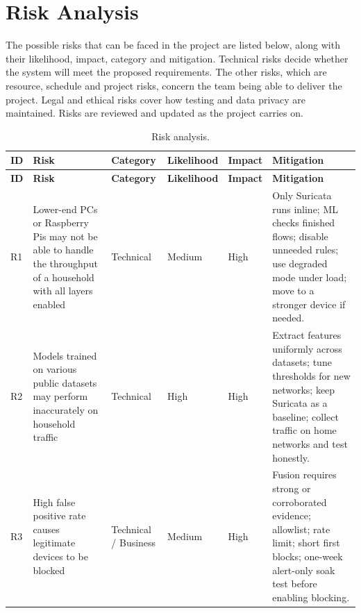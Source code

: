 \section{Risk Analysis}\label{sec:4.10}

\noindent The possible risks that can be faced in the project are listed below, along with their likelihood, impact, category and mitigation. Technical risks decide whether the system will meet the proposed requirements. The other risks, which are resource, schedule and project risks, concern the team being able to deliver the project. Legal and ethical risks cover how testing and data privacy are maintained. Risks are reviewed and updated as the project carries on.

{\footnotesize\setlength{\tabcolsep}{3.5pt}
\begin{longtable}{|>{\raggedright\arraybackslash}p{}|>{\raggedright\arraybackslash}p{}|>{\raggedright\arraybackslash}p{}|>{\raggedright\arraybackslash}p{}|>{\raggedright\arraybackslash}p{}|>{\raggedright\arraybackslash}p{}|}
\caption{Risk analysis.}\label{tab:4.29}\\
\hline
\textbf{ID} & \textbf{Risk} & \textbf{Category} & \textbf{Likelihood} & \textbf{Impact} & \textbf{Mitigation} \\ \hline
\endfirsthead
\hline
\textbf{ID} & \textbf{Risk} & \textbf{Category} & \textbf{Likelihood} & \textbf{Impact} & \textbf{Mitigation} \\ \hline
\endhead
R1 & Lower-end PCs or Raspberry Pis may not be able to handle the throughput of a household with all layers enabled & Technical & Medium & High & Only Suricata runs inline; ML checks finished flows; disable unneeded rules; use degraded mode under load; move to a stronger device if needed. \\ \hline
R2 & Models trained on various public datasets may perform inaccurately on household traffic & Technical & High & High & Extract features uniformly across datasets; tune thresholds for new networks; keep Suricata as a baseline; collect traffic on home networks and test honestly. \\ \hline
R3 & High false positive rate causes legitimate devices to be blocked & Technical / Business & Medium & High & Fusion requires strong or corroborated evidence; allowlist; rate limit; short first blocks; one-week alert-only soak test before enabling blocking. \\ \hline

\end{longtable}}
